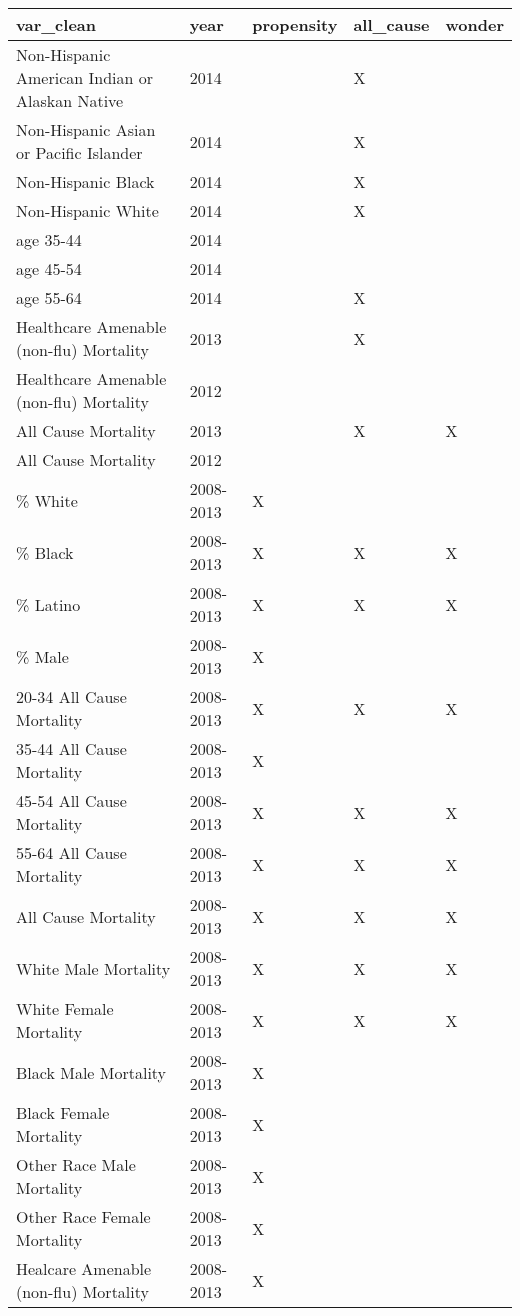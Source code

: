 \begin{table}[ht]
\centering
\begingroup\footnotesize
\begin{tabular}{lllll}
  \hline
var\_clean & year & propensity & all\_cause & wonder \\ 
  \hline
Non-Hispanic American Indian or Alaskan Native & 2014 &  & X &  \\ 
  Non-Hispanic Asian or Pacific Islander & 2014 &  & X &  \\ 
  Non-Hispanic Black & 2014 &  & X &  \\ 
  Non-Hispanic White & 2014 &  & X &  \\ 
  age 35-44 & 2014 &  &  &  \\ 
  age 45-54 & 2014 &  &  &  \\ 
  age 55-64 & 2014 &  & X &  \\ 
  Healthcare Amenable (non-flu) Mortality & 2013 &  & X &  \\ 
  Healthcare Amenable (non-flu) Mortality & 2012 &  &  &  \\ 
  All Cause Mortality & 2013 &  & X & X \\ 
  All Cause Mortality  & 2012 &  &  &  \\ 
  \% White & 2008-2013 & X &  &  \\ 
  \% Black & 2008-2013 & X & X & X \\ 
  \% Latino & 2008-2013 & X & X & X \\ 
  \% Male & 2008-2013 & X &  &  \\ 
  20-34 All Cause Mortality & 2008-2013 & X & X & X \\ 
  35-44  All Cause Mortality & 2008-2013 & X &  &  \\ 
  45-54  All Cause Mortality & 2008-2013 & X & X & X \\ 
  55-64  All Cause Mortality & 2008-2013 & X & X & X \\ 
  All Cause Mortality & 2008-2013 & X & X & X \\ 
  White Male Mortality & 2008-2013 & X & X & X \\ 
  White Female Mortality & 2008-2013 & X & X & X \\ 
  Black Male Mortality & 2008-2013 & X &  &  \\ 
  Black Female Mortality & 2008-2013 & X &  &  \\ 
  Other Race Male Mortality & 2008-2013 & X &  &  \\ 
  Other Race Female Mortality & 2008-2013 & X &  &  \\ 
  Healcare Amenable (non-flu) Mortality & 2008-2013 & X &  &  \\ 

\end{tabular}
\end{table}
